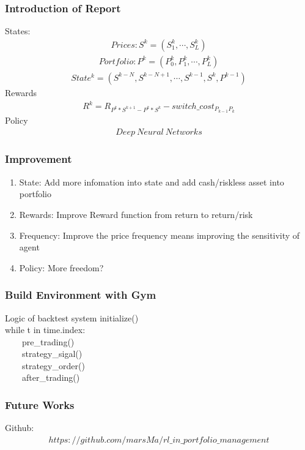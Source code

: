 \documentclass[11pt]{beamer}
\begin{document}
\begin{frame}[c]\frametitle{Introduction of Report}
    States:
    \begin{align*}
        Prices: S^{k}=(S_{1}^{k},\cdots,S_{L}^{k})
    \end{align*}
    \begin{align*}
        Portfolio: P^{k}=(P_{0}^{k},P_{1}^{k},\cdots,P_{L}^{k})
    \end{align*}
    \begin{align*}
        State^{k}=(S^{k-N},S^{k-N+1},\cdots,S^{k-1},S^{k},P^{k-1})
    \end{align*}
    Rewards
    \begin{align*}
        R^{k}=R_{P^{k}*S^{k+1}-P^{k}*S^{k}}-switch\_cost_{P_{k-1}P_{k}}
    \end{align*}
    Policy
    \begin{align*}
        Deep\ Neural\ Networks
    \end{align*}

\end{frame}

\begin{frame}[c]\frametitle{Improvement}
    \begin{enumerate}
        \item State: Add more infomation into state and add cash/riskless asset into portfolio
        \item Rewards: Improve Reward function from return to return/risk
        \item Frequency: Improve the price frequency means improving the sensitivity of agent
        \item Policy: More freedom?
    \end{enumerate}
\end{frame}

\begin{frame}[c]\frametitle{Build Environment with Gym}
    \begin{block}{Logic of backtest system}
    initialize()\\
    while t in time.index:\\ \ \ \ \ pre\_trading()\\ \ \ \ \ strategy\_sigal()\\ \ \ \ \  strategy\_order()\\ \ \ \ \ after\_trading()
    \end{block}
\end{frame}

\begin{frame}[c]\frametitle{Future Works}
Github:
\begin{align*}
    https://github.com/marsMa/rl\_in\_portfolio\_management
\end{align*}

\end{frame}
\end{document}
